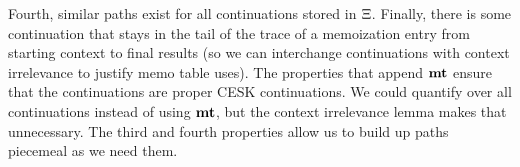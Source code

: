 %
Fourth, similar paths exist for all continuations stored in $\Xi$.
%
Finally, there is some continuation that stays in the tail of the trace of a memoization entry from starting context to final results (so we can interchange continuations with context irrelevance to justify memo table uses).
%
The properties that append $\mathbf{mt}$ ensure that the continuations are proper CESK continuations. We could quantify over all continuations instead of using $\mathbf{mt}$, but the context irrelevance lemma makes that unnecessary.
The third and fourth properties allow us to build up paths piecemeal as we need them.
%
%
%

